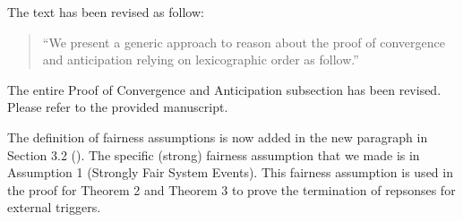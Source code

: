 \documentclass{response}
\begin{document}
\begin{comment}{Reviewer \#1}
• typo. relying on lexicographic order . . .
\end{comment}

\begin{response}
  The text has been revised as follow:
  \begin{quote}
    ``We present a generic approach to reason about the proof of
    convergence and anticipation relying on lexicographic order as
    follow.''
  \end{quote}
\end{response}



\begin{comment}{Reviewer \#1}
• The paragraph Proof of Convergence and Anticipation needs to
be written again. There are many typos: this event removes, discards,
decreases, accroding, . . .
Moreover the sentence
The external events are anticipated accroding to the above variants triv-
ially since they only modify the external queue eQ. Note that we do not
attempt to prove the convergence of any future events here. Instead, we
assume that these future events will be prove to be convergence later.
seems to me problematic. In your definition of anticipated you did not
say that these events should be proven convergent later?
\end{comment}

\begin{response}
  The entire Proof of Convergence and Anticipation subsection has been revised.
  Please refer to the provided manuscript.
\end{response}

\begin{comment}{Reviewer \#1}
• p.25 could you state explicitly your strong fairness property and the
interplay with the temporal properties you are concerned with.
\end{comment}

\begin{response}
  The definition of fairness assumptions is now added in the new
  paragraph in Section 3.2 (\EventB).  The specific (strong) fairness
  assumption that we made is in Assumption 1 (Strongly Fair System
  Events). This fairness assumption is used in the proof for Theorem 2
  and Theorem 3 to prove the termination of repsonses for external
  triggers.
\end{response}
\end{document}
